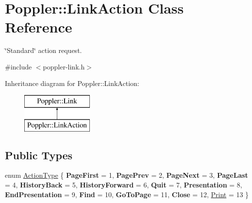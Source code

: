 \hypertarget{class_poppler_1_1_link_action}{}\section{Poppler\+:\+:Link\+Action Class Reference}
\label{class_poppler_1_1_link_action}


\char`\"{}\+Standard\char`\"{} action request.  




{\ttfamily \#include $<$poppler-\/link.\+h$>$}

Inheritance diagram for Poppler\+:\+:Link\+Action\+:\begin{figure}[H]
\begin{center}
\leavevmode
\includegraphics[height=2.000000cm]{class_poppler_1_1_link_action}
\end{center}
\end{figure}
\subsection*{Public Types}
\begin{DoxyCompactItemize}
\item 
enum \hyperlink{class_poppler_1_1_link_action_af9c6ee08681c0993083a6f817f9d099c}{Action\+Type} \{ \newline
{\bfseries Page\+First} = 1, 
{\bfseries Page\+Prev} = 2, 
{\bfseries Page\+Next} = 3, 
{\bfseries Page\+Last} = 4, 
\newline
{\bfseries History\+Back} = 5, 
{\bfseries History\+Forward} = 6, 
{\bfseries Quit} = 7, 
{\bfseries Presentation} = 8, 
\newline
{\bfseries End\+Presentation} = 9, 
{\bfseries Find} = 10, 
{\bfseries Go\+To\+Page} = 11, 
{\bfseries Close} = 12, 
\newline
\hyperlink{class_poppler_1_1_link_action_af9c6ee08681c0993083a6f817f9d099cade17a43b813a27e3363a3efca2e9a946}{Print} = 13
 \}
\end{DoxyCompactItemize}
